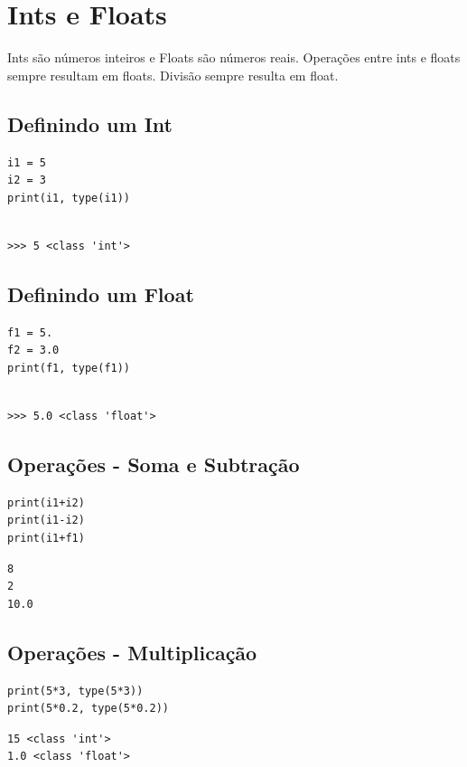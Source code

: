 \documentclass[presentation]{beamer}
\begin{document}
\section{Ints e Floats}
\label{sec:orgheadline45}
Ints são números inteiros e Floats são números reais. Operações entre ints e floats sempre resultam em floats. Divisão sempre resulta em float.
\subsection{Definindo um Int}
\label{sec:orgheadline34}
\begin{verbatim}
i1 = 5
i2 = 3
print(i1, type(i1))
\end{verbatim}

\begin{verbatim}

>>> 5 <class 'int'>
\end{verbatim}
\subsection{Definindo um Float}
\label{sec:orgheadline35}
\begin{verbatim}
f1 = 5.
f2 = 3.0
print(f1, type(f1))
\end{verbatim}

\begin{verbatim}

>>> 5.0 <class 'float'>
\end{verbatim}
\subsection{Operações - Soma e Subtração}
\label{sec:orgheadline36}
\begin{verbatim}
print(i1+i2)
print(i1-i2) 
print(i1+f1)
\end{verbatim}

\begin{verbatim}
8
2
10.0
\end{verbatim}
\subsection{Operações - Multiplicação}
\label{sec:orgheadline37}
\begin{verbatim}
print(5*3, type(5*3)) 
print(5*0.2, type(5*0.2))
\end{verbatim}

\begin{verbatim}
15 <class 'int'>
1.0 <class 'float'>
\end{verbatim}
\end{document}
